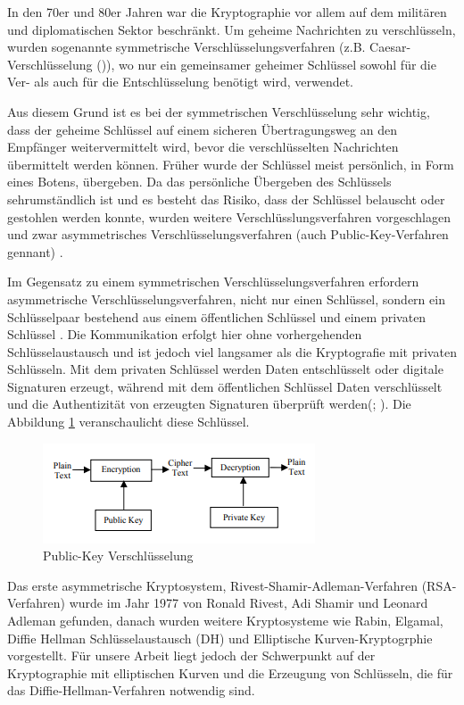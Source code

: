 In den 70er und 80er Jahren war die Kryptographie vor allem auf dem militären und diplomatischen Sektor beschränkt. Um geheime Nachrichten zu verschlüsseln, wurden sogenannte symmetrische Verschlüsselungsverfahren (z.B. Caesar-Verschlüsselung (\cite{moVarol})), wo nur ein gemeinsamer geheimer Schlüssel sowohl für die Ver- als auch für die Entschlüsselung benötigt wird, verwendet.

Aus diesem Grund ist es bei der symmetrischen Verschlüsselung sehr wichtig, dass der geheime Schlüssel auf einem sicheren Übertragungsweg an den Empfänger weitervermittelt wird, bevor die verschlüsselten Nachrichten übermittelt werden können. Früher wurde der Schlüssel meist persönlich, in Form eines Botens, übergeben. 
Da das persönliche Übergeben des Schlüssels sehrumständlich ist und es besteht das Risiko, dass der Schlüssel belauscht oder gestohlen werden konnte, wurden weitere Verschlüsslungsverfahren vorgeschlagen und zwar asymmetrisches Verschlüsselungsverfahren (auch Public-Key-Verfahren gennant) \cite{werner}. 

Im Gegensatz zu einem symmetrischen Verschlüsselungsverfahren erfordern asymmetrische Verschlüsselungsverfahren, nicht nur einen Schlüssel, sondern ein Schlüsselpaar bestehend aus einem öffentlichen Schlüssel und einem privaten Schlüssel \cite{damer}. Die Kommunikation erfolgt hier ohne vorhergehenden Schlüsselaustausch und ist jedoch viel langsamer als die Kryptografie mit privaten Schlüsseln. Mit dem privaten Schlüssel werden Daten entschlüsselt oder digitale Signaturen erzeugt, während mit dem öffentlichen Schlüssel Daten verschlüsselt und die Authentizität von erzeugten Signaturen überprüft  werden(\cite{sahuMa}; \cite{damer}). Die Abbildung \ref{key} veranschaulicht diese Schlüssel. 

\begin{figure}[!htb]
    \centering
    \includegraphics[width = 0.5 \textwidth]{Graphics/Fig1. Encryption.PNG}
    \caption{Public-Key Verschlüsselung}
    \label{key}
\end{figure}


Das erste asymmetrische Kryptosystem, Rivest-Shamir-Adleman-Verfahren (RSA-Verfahren) wurde im Jahr 1977 von Ronald Rivest, Adi Shamir und Leonard Adleman gefunden, 
danach wurden weitere Kryptosysteme wie Rabin, Elgamal, Diffie Hellman Schlüsselaustausch (DH) und Elliptische Kurven-Kryptogrphie vorgestellt.
Für unsere Arbeit liegt jedoch der Schwerpunkt auf der Kryptographie mit elliptischen Kurven und die Erzeugung von Schlüsseln, die für das Diffie-Hellman-Verfahren notwendig sind.


